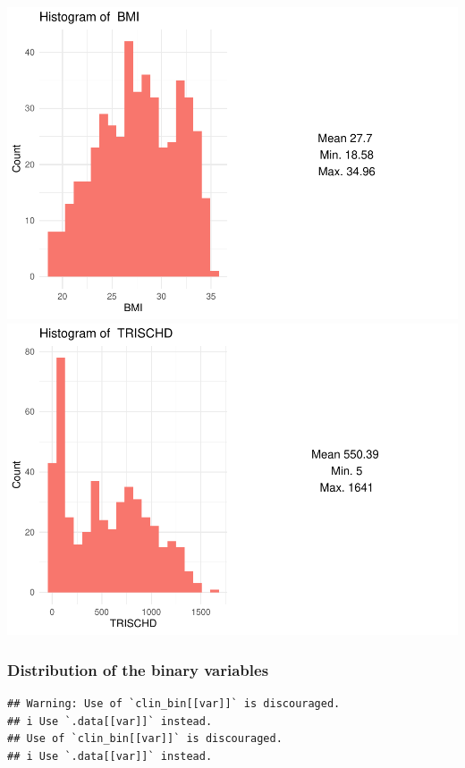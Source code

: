 \documentclass[
]{article}
\begin{document}
\includegraphics{Q1_markdown_files/figure-latex/unnamed-chunk-4-4.pdf}
\includegraphics{Q1_markdown_files/figure-latex/unnamed-chunk-4-5.pdf}

\hypertarget{distribution-of-the-binary-variables}{%
\subsubsection{Distribution of the binary
variables}\label{distribution-of-the-binary-variables}}

\begin{verbatim}
## Warning: Use of `clin_bin[[var]]` is discouraged.
## i Use `.data[[var]]` instead.
## Use of `clin_bin[[var]]` is discouraged.
## i Use `.data[[var]]` instead.
\end{verbatim}
\end{document}
